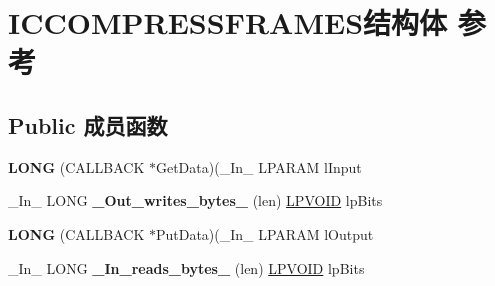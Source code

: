 \hypertarget{struct_i_c_c_o_m_p_r_e_s_s_f_r_a_m_e_s}{}\section{I\+C\+C\+O\+M\+P\+R\+E\+S\+S\+F\+R\+A\+M\+E\+S结构体 参考}
\label{struct_i_c_c_o_m_p_r_e_s_s_f_r_a_m_e_s}
\subsection*{Public 成员函数}
\begin{DoxyCompactItemize}
\item 
\mbox{\label{struct_i_c_c_o_m_p_r_e_s_s_f_r_a_m_e_s_ac34b74a439a634033f9051e464718bb3}} 
{\bfseries L\+O\+NG} (C\+A\+L\+L\+B\+A\+CK $\ast$Get\+Data)(\+\_\+\+In\+\_\+ L\+P\+A\+R\+AM l\+Input
\item 
\mbox{\label{struct_i_c_c_o_m_p_r_e_s_s_f_r_a_m_e_s_ad5ae9896320b5f7575bf522714452729}} 
\+\_\+\+In\+\_\+ L\+O\+NG {\bfseries \+\_\+\+Out\+\_\+writes\+\_\+bytes\+\_\+} (len) \hyperlink{interfacevoid}{L\+P\+V\+O\+ID} lp\+Bits
\item 
\mbox{\label{struct_i_c_c_o_m_p_r_e_s_s_f_r_a_m_e_s_af3c268489ea2d2d371aead921a9d6aeb}} 
{\bfseries L\+O\+NG} (C\+A\+L\+L\+B\+A\+CK $\ast$Put\+Data)(\+\_\+\+In\+\_\+ L\+P\+A\+R\+AM l\+Output
\item 
\mbox{\label{struct_i_c_c_o_m_p_r_e_s_s_f_r_a_m_e_s_a1672044919999600b1179686e3644df4}} 
\+\_\+\+In\+\_\+ L\+O\+NG {\bfseries \+\_\+\+In\+\_\+reads\+\_\+bytes\+\_\+} (len) \hyperlink{interfacevoid}{L\+P\+V\+O\+ID} lp\+Bits
\end{DoxyCompactItemize}
